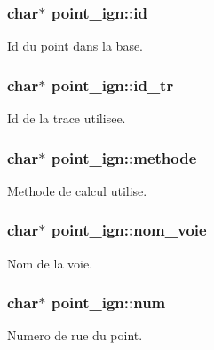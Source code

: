 \subsubsection[{\texorpdfstring{id}{id}}]{\setlength{\rightskip}{0pt plus 5cm}char$\ast$ point\+\_\+ign\+::id}\hypertarget{structpoint__ign_a704832d5fa3eab57fb9baa215ca7c736}{}\label{structpoint__ign_a704832d5fa3eab57fb9baa215ca7c736}
Id du point dans la base. 
\subsubsection[{\texorpdfstring{id\+\_\+tr}{id_tr}}]{\setlength{\rightskip}{0pt plus 5cm}char$\ast$ point\+\_\+ign\+::id\+\_\+tr}\hypertarget{structpoint__ign_a113ee6be0a8709a75afb5211112aaf93}{}\label{structpoint__ign_a113ee6be0a8709a75afb5211112aaf93}
Id de la trace utilisee. 
\subsubsection[{\texorpdfstring{methode}{methode}}]{\setlength{\rightskip}{0pt plus 5cm}char$\ast$ point\+\_\+ign\+::methode}\hypertarget{structpoint__ign_ab634196a26204fa50249254e42803b14}{}\label{structpoint__ign_ab634196a26204fa50249254e42803b14}
Methode de calcul utilise. 
\subsubsection[{\texorpdfstring{nom\+\_\+voie}{nom_voie}}]{\setlength{\rightskip}{0pt plus 5cm}char$\ast$ point\+\_\+ign\+::nom\+\_\+voie}\hypertarget{structpoint__ign_a6f967ee4079482aaec6a98393814f57f}{}\label{structpoint__ign_a6f967ee4079482aaec6a98393814f57f}
Nom de la voie. 
\subsubsection[{\texorpdfstring{num}{num}}]{\setlength{\rightskip}{0pt plus 5cm}char$\ast$ point\+\_\+ign\+::num}\hypertarget{structpoint__ign_a96809dab426ba9478803c60f91662809}{}\label{structpoint__ign_a96809dab426ba9478803c60f91662809}
Numero de rue du point. 

